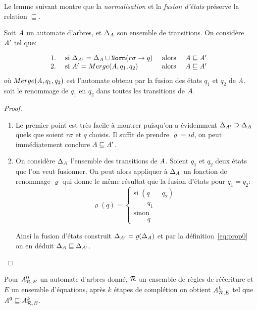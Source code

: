 Le lemme suivant montre que la \emph{normalisation} et la \emph{fusion
  d'états} préserve la relation $\sqsubseteq$.

\begin{lemma}
  Soit $\mathit A$ un automate d'arbres, et $\Delta_\mathit A$ son ensemble de transitions. 
  On considère $\mathit A'$ tel que:
  
  \[
  \begin{array}{llll}
    1. & \mbox{ si } \Delta_{\mathit A'} = \Delta_\mathit A \cup \mathtt{Norm}(r\sigma \rightarrow q) & \mbox{ alors } &\mathit A \sqsubseteq \mathit A' \\
    2. & \mbox{ si } \mathit A' = Merge(\mathit A, q_1, q_2) &\mbox{ alors }& \mathit A \sqsubseteq \mathit A'  \\
  \end{array}
  \]
  où $Merge(\mathit A,q_1,q_2)$ est l'automate obtenu par la fusion des états $q_1$ et $q_2$ de $\mathit A$, soit le renommage de  $q_1$
  en $q_2$ dans toutes les transitions de $\mathit A$.
\end{lemma}

\begin{proof}

  \begin{enumerate}
  \item Le premier point est très facile à montrer puisqu'on a évidemment $\Delta_{\mathit A'} \supseteq
    \Delta_\mathit A$ quels que soient $r\sigma$ et $q$ choisis.
    Il suffit de prendre $\varrho = id$, on peut immédiatement conclure $\mathit A
    \sqsubseteq \mathit A'$.

  \item On considère $\Delta_\mathit A$ l'ensemble des transitions de $\mathit A$. Soient $q_1$ et $q_2$ deux états
    que l'on veut fusionner.  On peut alors appliquer à $\Delta_\mathit A$ un fonction de renommage $\varrho$ qui donne le même 
    résultat que la fusion d'états pour $q_1 = q_2$:
    \[
    \varrho(q) = \left\{
      \begin{array}{l}
        \textrm{si }(q\ =\ q_2)\\
        \quad \quad q_1\\
        \textrm{sinon}\\
        \quad \quad q
      \end{array}\right.
    \]
    
    Ainsi la fusion d'états construit $\Delta_{\mathit A'} = \varrho(\Delta_\mathit A)$ et par 
    la définition~\ref{eq:prop0} on en déduit $\Delta_A \sqsubseteq \Delta_{\mathit A'}$.
  \end{enumerate}
\end{proof}


\begin{theorem}
  Pour ${\mathit A}_{\mathcal R,E}^0$ un automate d'arbres donné, $\mathcal R$ un ensemble de règles de réécriture
  et $E$ un ensemble d'équations, après $k$ étapes de complétion on obtient 
  ${\mathit A}_{\mathcal R,E}^k$ tel que  $\mathit A^0 \sqsubseteq {\mathit A}_{\mathcal R,E}^k$.
\end{theorem}

